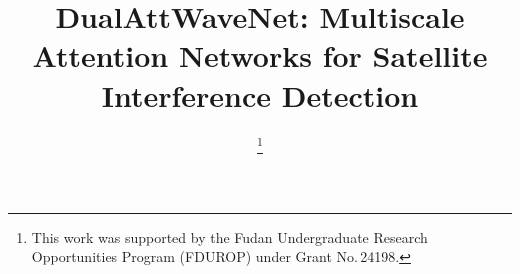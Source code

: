 \documentclass[conference]{IEEEtran}
\begin{document}
\title{DualAttWaveNet: Multiscale Attention Networks for Satellite Interference Detection}

\author{
    \thanks{This work was supported by the Fudan Undergraduate Research Opportunities Program (FDUROP) under Grant No.\,24198.}
}




\maketitle
\end{document}
